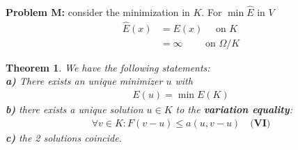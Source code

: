\documentclass[a4paper,12pt,oneside,fleqn]{book}
\newtheorem{theorem}{Theorem}[section]
\theoremstyle{definition}
\theoremstyle{remark}
\begin{document}
\quad\\
\textbf{Problem \textbf{M}:} consider the minimization in $K$. For $\min \hat{E}$ in $V$
\begin{align*}
	\hat{E}(x) &= E(x) \quad\text{ on } K\\
	&= \infty \qquad \text{ on } \Omega \slash K
\end{align*}


\begin{theorem}
We have the following statements:\\
\textbf{a) }There exists an unique minimizer $u$ with
	\begin{align*}
		E(u) = \min E(K)
	\end{align*}
	\textbf{b)} there exists a unique solution $u \in K$ to the \textbf{variation equality}:
	\begin{align*}
		\forall v \in K: F(v - u) \le a(u, v - u) \quad \textbf{(VI)}
	\end{align*}
	\textbf{c) }the 2 solutions coincide. 
\end{theorem}
\end{document}
